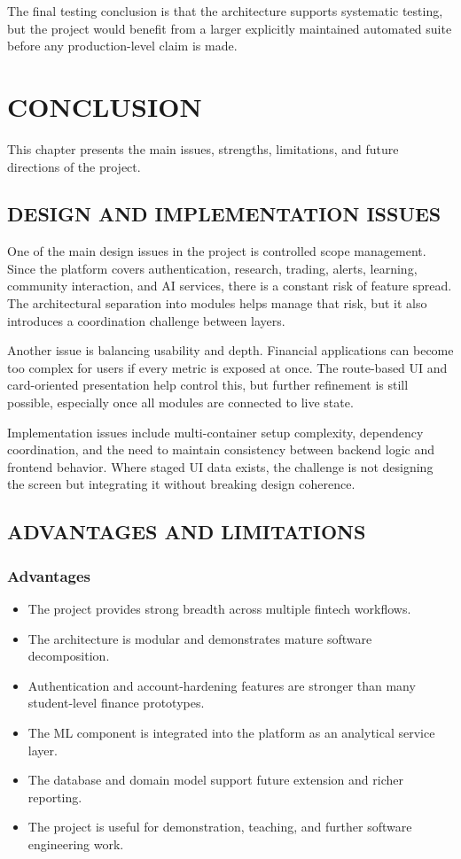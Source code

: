 \documentclass[12pt,a4paper]{report}
\begin{document}
The final testing conclusion is that the architecture supports systematic testing, but the project would benefit from a larger explicitly maintained automated suite before any production-level claim is made.

\chapter{CONCLUSION}
This chapter presents the main issues, strengths, limitations, and future directions of the project.

\section{DESIGN AND IMPLEMENTATION ISSUES}
One of the main design issues in the project is controlled scope management. Since the platform covers authentication, research, trading, alerts, learning, community interaction, and AI services, there is a constant risk of feature spread. The architectural separation into modules helps manage that risk, but it also introduces a coordination challenge between layers.

Another issue is balancing usability and depth. Financial applications can become too complex for users if every metric is exposed at once. The route-based UI and card-oriented presentation help control this, but further refinement is still possible, especially once all modules are connected to live state.

Implementation issues include multi-container setup complexity, dependency coordination, and the need to maintain consistency between backend logic and frontend behavior. Where staged UI data exists, the challenge is not designing the screen but integrating it without breaking design coherence.

\section{ADVANTAGES AND LIMITATIONS}
\subsection{Advantages}
\begin{itemize}
\item The project provides strong breadth across multiple fintech workflows.
\item The architecture is modular and demonstrates mature software decomposition.
\item Authentication and account-hardening features are stronger than many student-level finance prototypes.
\item The ML component is integrated into the platform as an analytical service layer.
\item The database and domain model support future extension and richer reporting.
\item The project is useful for demonstration, teaching, and further software engineering work.
\end{itemize}
\end{document}
